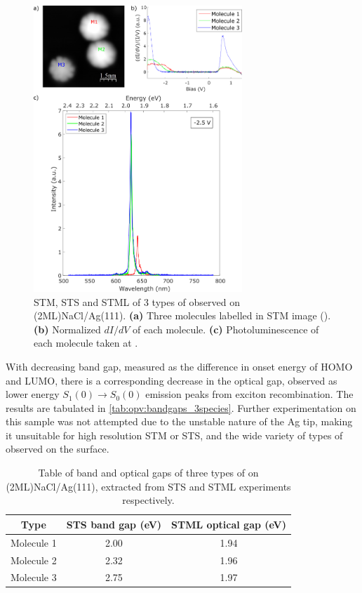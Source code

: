 \begin{figure} [H]
    \centering
        \includegraphics[width=0.7\textwidth]{pictures/3species_diagram.png}
        \caption{STM, STS and STML of 3 types of  observed on (2ML)NaCl/Ag(111). \textbf{(a)} Three molecules labelled in STM image (). \textbf{(b)} Normalized $dI/dV$ of each molecule. \textbf{(c)} Photoluminescence of each molecule taken at . }
    \label{fig:opv:f8znpc-sts_stml}
\end{figure}


With decreasing band gap, measured as the difference in onset energy of HOMO and LUMO, there is a corresponding decrease in the optical gap, observed as lower energy $S_1(0) \rightarrow S_0(0)$ emission peaks from exciton recombination. The results are tabulated in \autoref{tab:opv:bandgaps_3species}. Further experimentation on this sample was not attempted due to the unstable nature of the Ag tip, making it unsuitable for high resolution \ac{STM} or \ac{STS}, and the wide variety of types of  observed on the surface.
 
 \begin{table}
\begin{center}
    \begin{tabular}{|c|c|c|} 
    \hline
        Type  & STS band gap (eV)  &  STML optical gap (eV) \\
        \hline
        Molecule 1  &    2.00   & 1.94   \\
        Molecule 2  &    2.32   & 1.96 \\
        Molecule 3  &    2.75   & 1.97 \\
        \hline
    \end{tabular}
    \caption{Table of band and optical gaps of three types of  on (2ML)NaCl/Ag(111), extracted from STS and STML experiments respectively.}
    \label{tab:opv:bandgaps_3species}
    \end{center}
\end{table}


